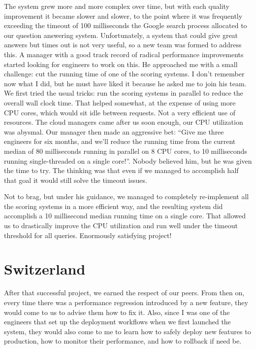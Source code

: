 \documentclass[12pt]{book}
\begin{document}
The system grew more and more complex over time, but with each quality
improvement it became slower and slower, to the point where it was
frequently exceeding the timeout of 100 milliseconds the Google search
process allocated to our question answering system. Unfortunately, a
system that could give great answers but times out is not very useful,
so a new team was formed to address this. A manager with a good track
record of radical performance improvements started looking for engineers
to work on this. He approached me with a small challenge: cut the
running time of one of the scoring systems. I don't remember now what I
did, but he must have liked it because he asked me to join his team. We
first tried the usual tricks: run the scoring systems in parallel to
reduce the overall wall clock time. That helped somewhat, at the expense
of using more CPU cores, which would sit idle between requests. Not a
very efficient use of resources. The cloud managers came after us soon
enough, our CPU utilization was abysmal. Our manager then made an
aggressive bet: ``Give me three engineers for six months, and we'll
reduce the running time from the current median of 80 milliseconds
running in parallel on 8 CPU cores, to 10 milliseconds running
single-threaded on a single core!''. Nobody believed him, but he was
given the time to try. The thinking was that even if we managed to
accomplish half that goal it would still solve the timeout issues.

Not to brag, but under his guidance, we managed to completely
re-implement all the scoring systems in a more efficient way, and the
resulting system did accomplish a 10 millisecond median running time on
a single core. That allowed us to drastically improve the CPU
utilization and run well under the timeout threshold for all queries.
Enormously satisfying project!


\section{Switzerland}

After that successful project, we earned the respect of our peers. From
then on, every time there was a performance regression introduced by a
new feature, they would come to us to advise them how to fix it. Also,
since I was one of the engineers that set up the deployment workflows
when we first launched the system, they would also come to me to learn
how to safely deploy new features to production, how to monitor their
performance, and how to rollback if need be.
\end{document}
